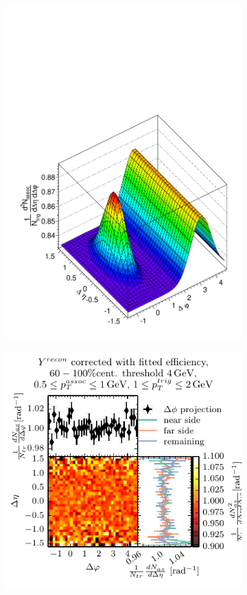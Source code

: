 \begin{figure}
  \centering
  \begin{subfigure}{0.5\textwidth}
    \includegraphics[width=\textwidth]{figures/fitted_function.pdf}
  \end{subfigure}%
  \begin{subfigure}{0.5\textwidth}
    \includegraphics{figures/2d_corrected_recon.pdf}

\end{subfigure}
\end{figure}
